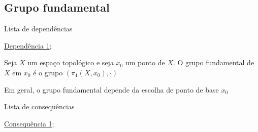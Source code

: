\subsection{Grupo fundamental}
\label{grupo-fundamental-def}
\begin{titlemize}{Lista de dependências}
	\item \hyperref[produto-bem-definido-prop]{Dependência 1};\\ %
\end{titlemize}
\begin{defi}
	Seja $X$ um espaço topológico e seja $x_0$ um ponto de $X.$ O grupo fundamental de $X$ em $x_0$ é o grupo $(\pi_1(X,x_0),\cdot)$
\end{defi}

Em geral, o grupo fundamental depende da escolha de ponto de base $x_0$

\begin{titlemize}{Lista de consequências}
	\item \hyperref[hom-grupo-fundamental]{Consequência 1};\\ %
	\item \hyperref[]{}
\end{titlemize}
